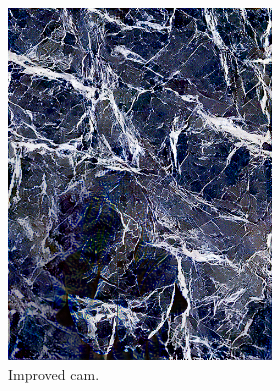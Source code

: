 \begin{figure}[]
\begin{subfigure}{\textwidth}
\begin{subfigure}{0.24\textwidth}
            \includegraphics[width=\textwidth]{images/04-experiment02/human/marble/improved_proj.jpg}
            \caption*{Improved cam.}
        \end{subfigure}
        \hfill
        \begin{subfigure}{0.24\textwidth}
            \centering

\end{subfigure}
\end{subfigure}
\end{figure}
